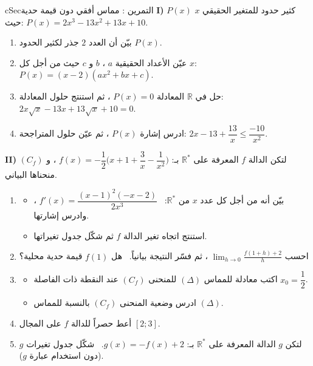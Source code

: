 \documentclass[12pt,a4paper]{article}
\newenvironment{BOX}[2]{\begin{otherlanguage}{english}\begin{arbox}{#1}{#2}}{\end{arbox}\end{otherlanguage}}
\newcounter{exo}
\newenvironment{tamrin}[1]{\stepcounter{exo}\begin{BOX}{cSec}{التمرين \theexo: #1}}{\end{BOX}}
\newcommand{\R}{\mathbb{R}}
\newenvironment{sq}{\begin{itemize}[leftmargin=2.4em,itemsep=3pt]}{\end{itemize}}
\newcommand{\qa}{\item[(أ)]}\newcommand{\qb}{\item[(ب)]}\newcommand{\qc}{\item[(جـ)]}\newcommand{\qd}{\item[(د)]}\newcommand{\qe}{\item[(هـ)]}
\begin{document}
\begin{tamrin}{مماس أفقي دون قيمة حدية}
\textbf{I)} $P(x)$ كثير حدود للمتغير الحقيقي $x$ حيث: $P(x)=2x^3-13x^2+13x+10$.
\begin{enumerate}
\item بيّن أن العدد $2$ جذر لكثير الحدود $P(x)$.
\item عيّن الأعداد الحقيقية $a$ ، $b$ و $c$ حيث من أجل كل $x$: \ $P(x)=(x-2)(ax^2+bx+c)$.
\item حل في $\R$ المعادلة $P(x)=0$ ، ثم استنتج حلول المعادلة: $2x\sqrt x-13x+13\sqrt x+10=0$.
\item ادرس إشارة $P(x)$ ، ثم عيّن حلول المتراجحة: $2x-13+\dfrac{13}{x}\le\dfrac{-10}{x^2}$.
\end{enumerate}
\textbf{II)} لتكن الدالة $f$ المعرفة على $\R^*$ بـ: $f(x)=-\dfrac12\Big(x+1+\dfrac3x-\dfrac1{x^2}\Big)$ ، و $(C_f)$ منحناها البياني.
\begin{enumerate}
\item
\begin{sq}
\qa بيّن أنه من أجل كل عدد $x$ من $\R^*$: \ $f'(x)=\dfrac{(x-1)^2(-x-2)}{2x^3}$ ، وادرس إشارتها.
\qb استنتج اتجاه تغير الدالة $f$ ثم شكّل جدول تغيراتها.
\end{sq}
\item احسب $\displaystyle\lim_{h\to0}\frac{f(1+h)+2}{h}$ ، ثم فسّر النتيجة بيانياً. \ هل $f(1)$ قيمة حدية محلية؟
\item
\begin{sq}
\qa اكتب معادلة للمماس $(\Delta)$ للمنحنى $(C_f)$ عند النقطة ذات الفاصلة $x_0=\dfrac12$.
\qb ادرس وضعية المنحنى $(C_f)$ بالنسبة للمماس $(\Delta)$.
\end{sq}
\item أعط حصراً للدالة $f$ على المجال $[2;3]$.
\item لتكن $g$ الدالة المعرفة على $\R^*$ بـ: $g(x)=-f(x)+2$. \ شكّل جدول تغيرات $g$ (دون استخدام عبارة $g$).
\end{enumerate}
\end{tamrin}
\end{document}

